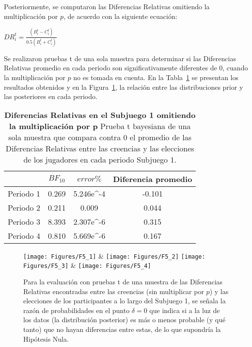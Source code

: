 Posteriormente, se computaron las Diferencias Relativas omitiendo la multiplicación por $p$, de acuerdo con la siguiente ecuación:\\

\begin{center}
$DR_i^t=  \frac{(B_i^t- C_i^t)}{0.5(B_i^t+ C_i^t)}$
\end{center}

Se realizaron pruebas t de una sola muestra para determinar si las Diferencias Relativas promedio en cada periodo son significativamente diferentes de 0, cuando la multiplicación por $p$ no es tomada en cuenta. En la Tabla~\ref{DRnop-S1-B} se presentan los resultados obtenidos y en la Figura~\ref{fig:DRnop_S1}, la relación entre las distribuciones prior y las posteriores en cada periodo.\\


\begin{table}[h]
\caption[Diferencias Relativas en el Subjuego 1, omitiendo la multiplicación por $p$ (prueba t de una muestra)]{\textbf{Diferencias Relativas en el Subjuego 1 omitiendo la multiplicación por p} Prueba t bayesiana de una sola muestra que compara contra 0 el promedio de las Diferencias Relativas entre las creencias y las elecciones de los jugadores en cada periodo Subjuego 1.}
\label{DRnop-S1-B}
\centering
\begin{tabular}{l | c c | c}
\toprule
\textbf{} & \textbf{$BF_{10}$} & \textbf{$error\%$} & \textbf{Diferencia promedio}\\
\midrule
Periodo 1 & 0.269 & 5.246e^-4 & -0.101\\
Periodo 2 & 0.211 & 0.009 & 0.044\\
Periodo 3 & 8.393 & 2.307e^-6 & 0.315\\
Periodo 4 & 0.810 & 5.669e^-6 & 0.167\\
\bottomrule
\end{tabular}
\end{table}
	

\begin{figure}[hp]
\centering
\texttt{[image: Figures/F5\_1]} & \texttt{[image: Figures/F5\_2]} 
\texttt{[image: Figures/F5\_3]} & \texttt{[image: Figures/F5\_4]} 
\decoRule
\caption[Diferencias Relativas entre creencias y elecciones en el Subjuego 1 sin la multiplicación por p (Factor de Bayes)]{Para la evaluación con pruebas t de una muestra de las Diferencias Relativas encontradas entre las creencias (sin multiplicar por $p$) y las elecciones de los participantes a lo largo del Subjuego 1, se señala la razón de probabilidades en el punto $\delta = 0$ que indica si a la luz de los datos (la distribución posterior) es más o menos probable (y qué tanto) que no hayan diferencias entre estas, de lo que supondría la Hipótesis Nula.}
\label{fig:DRnop_S1}
\end{figure}


